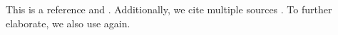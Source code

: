 This is a reference \cite{smith2023} and \cite{doe2022}.
Additionally, we cite multiple sources \cite{johnson2021, williams2020}.
To further elaborate, we also use \cite{smith2023, doe2022} again.